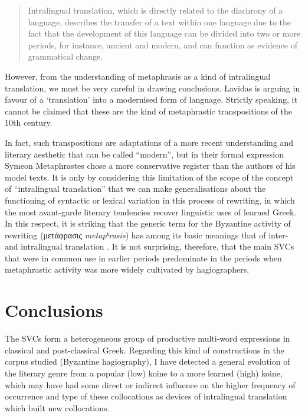\documentclass[output=paper,colorlinks,citecolor=brown]{langscibook}
\begin{document}
\begin{quote}
  Intralingual translation, which is directly related to the diachrony of a language,
  describes the transfer of a text within one language due to the fact that the
  development of this language can be divided into two or more periods, for instance,
  ancient and modern, and can function as evidence of grammatical change.
\end{quote}

However, from the understanding of metaphrasis as a kind of intralingual translation, we
must be very careful in drawing conclusions. Lavidas is arguing in favour of a
`translation' into a modernised form of language.
Strictly speaking, it cannot be claimed that these are the kind of metaphrastic
transpositions of the 10th century.

In fact, such transpositions are adaptations of a more recent understanding and literary
aesthetic that can be called ``modern'', but in their formal expression Symeon Metaphrastes
chose a more conservative register than the authors of his model texts. It is only by
considering this limitation of the scope of the concept of ``intralingual translation''
that we can make generalisations about the functioning of syntactic or lexical variation
in this process of rewriting, in which the most avant-garde literary tendencies recover
linguistic uses of learned Greek. In this respect, it is striking that the generic term
for the Byzantine activity of rewriting (μετάφρασις \emph{metapʰrasis})
has among its basic meanings that of inter- and intralingual translation
\parencite{SignesCodonerJuan-2014739}. It is not surprising, therefore, that the main SVCs
that were in common use in earlier periods predominate in the periods when metaphrastic
activity was more widely cultivated by hagiographers.

\section{Conclusions}\label{sec:vc:6}

The SVCs form a heterogeneous group of productive multi-word expressions in classical and
post-classical Greek. Regarding this kind of constructions in the corpus studied
(Byzantine hagiography), I have detected a general evolution of the literary genre from a
popular (low) koine to a more learned (high) koine, which may have had some direct or
indirect influence on the higher frequency of occurrence and type of these collocations as
devices of intralingual translation which built new collocations.
\end{document}

